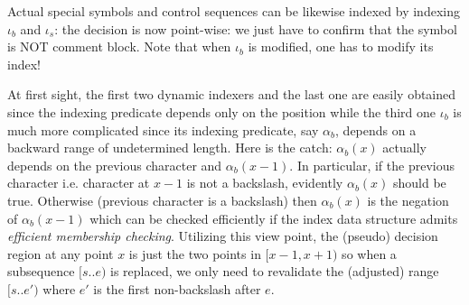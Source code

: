 \documentclass{amsart}
\newcommand{\idx}{\iota}
\begin{document}
Actual special symbols and control sequences can be likewise indexed by indexing $\idx_b$ and $\idx_s$: the decision is now point-wise: we just have to confirm that the symbol is NOT comment block. Note that when $\idx_b$ is modified, one has to modify its index!

At first sight, the first two dynamic indexers and the last one are easily obtained since the indexing predicate depends only on the position while the third one $\idx_{b}$ is much more complicated since its indexing predicate, say $\alpha_{b}$, depends on a backward range of undetermined length. Here is the catch: $\alpha_{b}(x)$ actually depends on the previous character and $\alpha_{b}(x-1)$. In particular, if the previous character i.e. character at $x-1$ is not a backslash, evidently $\alpha_{b}(x)$ should be true. Otherwise (previous character is a backslash) then $\alpha_{b}(x)$ is the negation of $\alpha_{b}(x - 1)$ which can be checked efficiently if the index data structure admits \emph{efficient membership checking}. Utilizing this view point, the (pseudo) decision region at any point $x$ is just the two points in $[x-1,x+1)$ so when a subsequence $[s..e)$ is replaced, we only need to revalidate the (adjusted) range $[s..e')$ where $e'$ is the first non-backslash after $e$.
\end{document}
